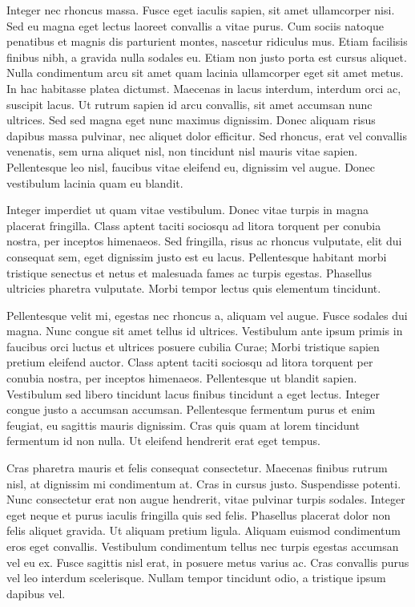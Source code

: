 Integer nec rhoncus massa. Fusce eget iaculis sapien, sit amet ullamcorper nisi. Sed eu magna eget lectus laoreet convallis a vitae purus. Cum sociis natoque penatibus et magnis dis parturient montes, nascetur ridiculus mus. Etiam facilisis finibus nibh, a gravida nulla sodales eu. Etiam non justo porta est cursus aliquet. Nulla condimentum arcu sit amet quam lacinia ullamcorper eget sit amet metus. In hac habitasse platea dictumst. Maecenas in lacus interdum, interdum orci ac, suscipit lacus. Ut rutrum sapien id arcu convallis, sit amet accumsan nunc ultrices. Sed sed magna eget nunc maximus dignissim. Donec aliquam risus dapibus massa pulvinar, nec aliquet dolor efficitur. Sed rhoncus, erat vel convallis venenatis, sem urna aliquet nisl, non tincidunt nisl mauris vitae sapien. Pellentesque leo nisl, faucibus vitae eleifend eu, dignissim vel augue. Donec vestibulum lacinia quam eu blandit.

Integer imperdiet ut quam vitae vestibulum. Donec vitae turpis in magna placerat fringilla. Class aptent taciti sociosqu ad litora torquent per conubia nostra, per inceptos himenaeos. Sed fringilla, risus ac rhoncus vulputate, elit dui consequat sem, eget dignissim justo est eu lacus. Pellentesque habitant morbi tristique senectus et netus et malesuada fames ac turpis egestas. Phasellus ultricies pharetra vulputate. Morbi tempor lectus quis elementum tincidunt.

Pellentesque velit mi, egestas nec rhoncus a, aliquam vel augue. Fusce sodales dui magna. Nunc congue sit amet tellus id ultrices. Vestibulum ante ipsum primis in faucibus orci luctus et ultrices posuere cubilia Curae; Morbi tristique sapien pretium eleifend auctor. Class aptent taciti sociosqu ad litora torquent per conubia nostra, per inceptos himenaeos. Pellentesque ut blandit sapien. Vestibulum sed libero tincidunt lacus finibus tincidunt a eget lectus. Integer congue justo a accumsan accumsan. Pellentesque fermentum purus et enim feugiat, eu sagittis mauris dignissim. Cras quis quam at lorem tincidunt fermentum id non nulla. Ut eleifend hendrerit erat eget tempus.

Cras pharetra mauris et felis consequat consectetur. Maecenas finibus rutrum nisl, at dignissim mi condimentum at. Cras in cursus justo. Suspendisse potenti. Nunc consectetur erat non augue hendrerit, vitae pulvinar turpis sodales. Integer eget neque et purus iaculis fringilla quis sed felis. Phasellus placerat dolor non felis aliquet gravida. Ut aliquam pretium ligula. Aliquam euismod condimentum eros eget convallis. Vestibulum condimentum tellus nec turpis egestas accumsan vel eu ex. Fusce sagittis nisl erat, in posuere metus varius ac. Cras convallis purus vel leo interdum scelerisque. Nullam tempor tincidunt odio, a tristique ipsum dapibus vel.

